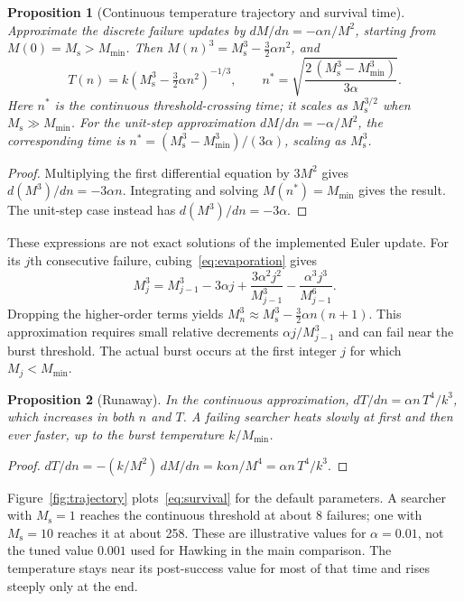 \documentclass[10pt,a4paper]{article}
\newtheorem{proposition}{Proposition}
\newcommand{\Ms}{M_{\mathrm{s}}}
\newcommand{\Mmin}{M_{\min}}
\begin{document}
\begin{proposition}[Continuous temperature trajectory and survival time]
Approximate the discrete failure updates by $dM/dn=-\alpha n/M^2$, starting from
$M(0)=\Ms>\Mmin$. Then $M(n)^3=\Ms^3-\tfrac32\alpha n^2$, and
\begin{equation}
  T(n) = k\left(\Ms^3 - \tfrac32 \alpha n^2\right)^{-1/3},\qquad
  n^\ast = \sqrt{\frac{2\,(\Ms^3 - \Mmin^3)}{3\alpha}}.
  \label{eq:survival}
\end{equation}
Here $n^\ast$ is the continuous threshold-crossing time; it scales as
$\Ms^{3/2}$ when $\Ms\gg\Mmin$. For the unit-step approximation
$dM/dn=-\alpha/M^2$, the corresponding time is
$n^\ast=(\Ms^3-\Mmin^3)/(3\alpha)$, scaling as $\Ms^3$.
\end{proposition}
\begin{proof}
Multiplying the first differential equation by $3M^2$ gives
$d(M^3)/dn=-3\alpha n$. Integrating and solving $M(n^\ast)=\Mmin$ gives the
result. The unit-step case instead has $d(M^3)/dn=-3\alpha$.
\end{proof}

These expressions are not exact solutions of the implemented Euler update.
For its $j$th consecutive failure, cubing~\eqref{eq:evaporation} gives
\begin{equation}
 M_j^3=M_{j-1}^3-3\alpha j
       +\frac{3\alpha^2j^2}{M_{j-1}^3}
       -\frac{\alpha^3j^3}{M_{j-1}^6}.
 \label{eq:discrete-mass}
\end{equation}
Dropping the higher-order terms yields
$M_n^3\approx\Ms^3-\tfrac32\alpha n(n+1)$. This approximation requires small
relative decrements $\alpha j/M_{j-1}^3$ and can fail near the burst threshold.
The actual burst occurs at the first integer $j$ for which $M_j<\Mmin$.

\begin{proposition}[Runaway]
In the continuous approximation, $dT/dn = \alpha n\,T^4/k^3$, which increases in both $n$ and $T$. A failing searcher
heats slowly at first and then ever faster, up to the burst temperature $k/\Mmin$.
\end{proposition}
\begin{proof}
$dT/dn = -(k/M^2)\,dM/dn = k\alpha n / M^4 = \alpha n\, T^4/k^3$.
\end{proof}

Figure~\ref{fig:trajectory} plots~\eqref{eq:survival} for the default parameters. A
searcher with $\Ms = 1$ reaches the continuous threshold at about 8 failures;
one with $\Ms = 10$ reaches it at about 258. These are illustrative values for
$\alpha=0.01$, not the tuned value $0.001$ used for Hawking in the main comparison. The temperature stays near its post-success
value for most of that time and rises steeply only at the end.
\end{document}
